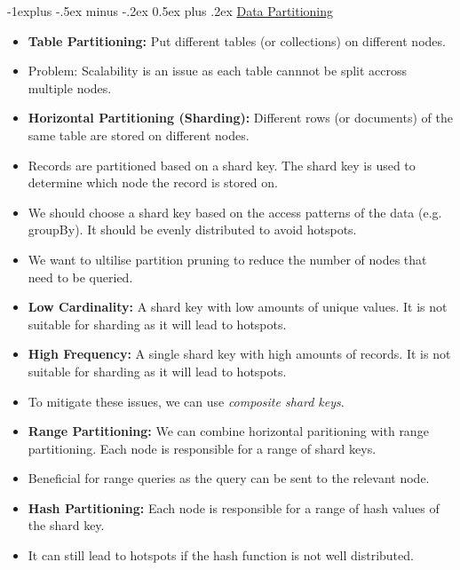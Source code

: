 \documentclass[10pt, landscape]{article}
\makeatletter
\renewcommand{\subsection}{\@startsection{subsection}{2}{0mm}%
  {-1explus -.5ex minus -.2ex}%
  {0.5ex plus .2ex}%
{\normalfont\normalsize\bfseries}}
\makeatother
\begin{document}
\begin{multicols*}{4}
  \subsection{\underline{Data Partitioning}}
  \begin{itemize}
    \item \textbf{Table Partitioning:} Put different tables (or collections) on different nodes.
    \item Problem: Scalability is an issue as each table cannnot be split accross multiple nodes.
    \item \textbf{Horizontal Partitioning (Sharding):} Different rows (or documents) of the same table are stored on different nodes.
    \item Records are partitioned based on a shard key. The shard key is used to determine which node the record is stored on.
    \item We should choose a shard key based on the access patterns of the data (e.g. groupBy). It should be evenly distributed to avoid hotspots.
    \item We want to ultilise partition pruning to reduce the number of nodes that need to be queried.
    \item \textbf{Low Cardinality:} A shard key with low amounts of unique values. It is not suitable for sharding as it will lead to hotspots.
    \item \textbf{High Frequency:} A single shard key with high amounts of records. It is not suitable for sharding as it will lead to hotspots.
    \item To mitigate these issues, we can use \textit{composite shard keys}.
    \item \textbf{Range Partitioning:} We can combine horizontal paritioning with range partitioning. Each node is responsible for a range of shard keys.
    \item Beneficial for range queries as the query can be sent to the relevant node.
    \item \textbf{Hash Partitioning:} Each node is responsible for a range of hash values of the shard key.
    \item It can still lead to hotspots if the hash function is not well distributed.
  \end{itemize}


\end{multicols*}
\end{document}
